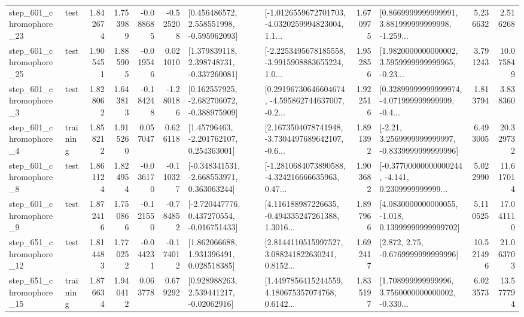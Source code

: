 \begin{tabular}{llrrrrllrlrr}
  step\_601\_chromophore\_23 &      test &      1.842674 &    1.753989 &     -0.088685 & -0.525208 &    [0.456486572, 2.558551998, -0.595962093] &  [-1.0126559672701703, -4.0320259994823004, 1.1... &       1.670975 &  [0.8669999999999991, 3.881999999999998, -1.259... &            5.236632 &          2.516268 \\
  step\_601\_chromophore\_25 &      test &      1.905451 &    1.885905 &     -0.019546 &  0.021010 &    [1.379839118, 2.398748731, -0.337260081] &  [-2.2253495678185558, -3.9915908883655224, 1.0... &       1.952856 &  [1.9820000000000002, 3.5959999999999965, -0.23... &            3.791243 &         10.075849 \\
   step\_601\_chromophore\_3 &      test &      1.828062 &    1.643813 &     -0.184248 & -1.280186 &   [0.162557925, -2.682706072, -0.388975909] &  [0.29196730646604674, -4.595862744637007, -0.2... &       1.922516 &  [0.32899999999999974, -4.071999999999999, -0.4... &            1.813794 &          3.838360 \\
   step\_601\_chromophore\_4 &  training &      1.858212 &    1.915260 &      0.057047 &  0.626118 &     [1.45796463, -2.201762107, 0.254363001] &  [2.1673504078741948, -3.7304497689642107, -0.6... &       1.891392 &   [-2.21, 3.2569999999999997, -0.8339999999999996] &            6.493005 &         20.329732 \\
   step\_601\_chromophore\_8 &      test &      1.861124 &    1.824954 &     -0.036170 & -0.110327 &   [-0.348341531, -2.668553971, 0.363063244] &  [-1.2810684073890588, -4.324216666635963, 0.47... &       1.903682 &  [-0.37700000000000244, -4.141, 0.2309999999999... &            5.022990 &         11.617014 \\
   step\_601\_chromophore\_9 &      test &      1.872416 &    1.750866 &     -0.121550 & -0.784852 &   [-2.720447776, 0.437270554, -0.016751433] &  [4.116188987226635, -0.494335247261388, 1.3016... &       1.897966 &  [4.0830000000000055, -1.018, 0.13999999999999702] &            5.110525 &         17.041110 \\
  step\_651\_chromophore\_12 &      test &      1.814483 &    1.770252 &     -0.044231 & -0.174012 &     [1.862066688, 1.931396491, 0.028518385] &  [2.8144110515997527, 3.088241822630241, 0.8152... &       1.692417 &                 [2.872, 2.75, -0.6769999999999996] &           10.521496 &         21.063703 \\
  step\_651\_chromophore\_15 &  training &      1.876634 &    1.940412 &      0.063778 &  0.679292 &     [0.928988263, 2.539441217, -0.02062916] &  [1.4497856415244559, 4.180675357074768, 0.6142... &       1.835197 &  [1.708999999999996, 3.7560000000000002, -0.330... &            6.023573 &         13.577794 \\

\end{tabular}
